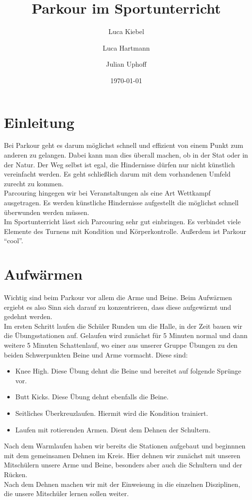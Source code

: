 \documentclass[ngerman,12pt,titlepage]{scrartcl}
\title{Parkour im Sportunterricht}
\author{Luca Kiebel \and Luca Hartmann \and Julian Uphoff}
\date{\today}
\begin{document}
\maketitle
\newpage

\section{Einleitung}
Bei Parkour geht es darum möglichst schnell und effizient von einem Punkt zum anderen zu gelangen.
Dabei kann man dies überall machen, ob in der Stat oder in der Natur.
Der Weg selbst ist egal, die Hindernisse dürfen nur nicht künstlich vereinfacht werden. Es geht schließlich darum mit dem vorhandenen Umfeld zurecht zu kommen.\\ Parcouring hingegen wir bei Veranstaltungen als eine Art Wettkampf ausgetragen. Es werden künstliche Hindernisse aufgestellt die möglichst schnell überwunden werden müssen. \\ Im Sportunterricht lässt sich Parcouring sehr gut einbringen. Es verbindet viele Elemente des Turnens mit Kondition und Körperkontrolle. Außerdem ist Parkour \enquote{cool}.

\section{Aufwärmen}
Wichtig sind beim Parkour vor allem die Arme und Beine. Beim Aufwärmen ergiebt es also Sinn sich darauf zu konzentrieren, dass diese aufgewärmt und gedehnt werden.  \\ Im ersten Schritt laufen die Schüler Runden um die Halle, in der Zeit bauen wir die Übungsstationen auf. Gelaufen wird zunächst für 5 Minuten normal und dann weitere 5 Minuten Schattenlauf, wo einer aus unserer Gruppe Übungen zu den beiden Schwerpunkten Beine und Arme vormacht. Diese sind:
\begin{itemize}
	\item Knee High. Diese Übung dehnt die Beine und bereitet auf folgende Sprünge vor.
	\item Butt Kicks. Diese Übung dehnt ebenfalls die Beine.
	\item Seitliches Überkreuzlaufen. Hiermit wird die Kondition trainiert.
	\item Laufen mit rotierenden Armen. Dient dem Dehnen der Schultern.
\end{itemize}
Nach dem Warmlaufen haben wir bereits die Stationen aufgebaut und beginnnen mit dem gemeinsamen Dehnen im Kreis. Hier dehnen wir zunächst mit unseren Mitschülern unsere Arme und Beine, besonders aber auch die Schultern und der Rücken. \\ Nach dem Dehnen machen wir mit der Einweisung in die einzelnen Disziplinen, die unsere Mitschüler lernen sollen weiter.
\end{document}
